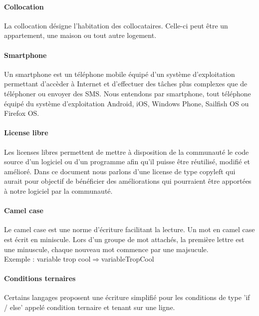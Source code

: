 \paragraph{Collocation}
La collocation désigne l'habitation des collocataires. Celle-ci peut être un appartement, une maison ou tout autre logement.

\paragraph{Smartphone}
Un smartphone est un téléphone mobile équipé d'un système d'exploitation permettant d'accèder à Internet et d'effectuer des tâches plus complexes que de téléphoner ou envoyer des SMS. Nous entendons par smartphone, tout téléphone équipé du système d'exploitation Android, iOS, Windows Phone, Sailfish OS ou Firefox OS.

\paragraph{License libre}
Les licenses libres permettent de mettre à disposition de la communauté le code source d'un logiciel ou d'un programme afin qu'il puisse être réutilisé, modifié et amélioré. Dans ce document nous parlons d'une license de type copyleft qui aurait pour objectif de bénéficier des améliorations qui pourraient être apportées à notre logiciel par la communauté.

\paragraph{Camel case}
Le camel case est une norme d'écriture facilitant la lecture. Un mot en camel case est écrit en miniscule. Lors d'un groupe de mot attachés, la première lettre est une minuscule, chaque nouveau mot commence par une majsucule.\\
Exemple : variable trop cool$ \Rightarrow $variableTropCool

\paragraph{Conditions ternaires}
Certains langages proposent une écriture simplifié pour les conditions de type 'if / else' appelé condition ternaire et tenant sur une ligne.
